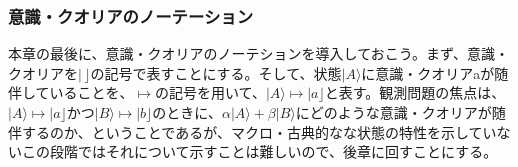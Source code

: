 \subsubsection{意識・クオリアのノーテーション}
本章の最後に、意識・クオリアのノーテションを導入しておこう。まず、意識・クオリアを$|\,\rfloor$の記号で表すことにする。そして、状態$|A\rangle$に意識・クオリアaが随伴していることを、$\mapsto$の記号を用いて、$|A\rangle \mapsto |a \rfloor$と表す。観測問題の焦点は、$|A\rangle \mapsto |a \rfloor$かつ$|B\rangle \mapsto |b \rfloor$のときに、$\alpha|A\rangle + \beta|B\rangle$にどのような意識・クオリアが随伴するのか、ということであるが、マクロ・古典的なな状態の特性を示していないこの段階ではそれについて示すことは難しいので、後章に回すことにする。
